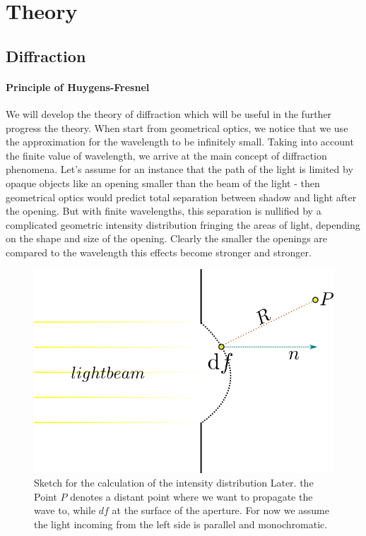 \section{Theory}
\subsection{Diffraction}
\paragraph{Principle of Huygens-Fresnel}
We will develop the theory of diffraction \cite{landau2} which will be useful in the further progress
the theory. When start from geometrical optics, we notice that we use the approximation for the 
wavelength to be infinitely small. Taking into account the finite value of wavelength, we arrive at the
main concept of diffraction phenomena. Let's assume for an instance that the path of the light is limited by
opaque objects like an opening smaller than the beam of the light - then geometrical optics would predict 
total separation between shadow and light after the opening. But with finite wavelengths, this separation
is nullified by a complicated geometric intensity distribution fringing the areas of light,
depending on the shape and size of the opening. Clearly the smaller the openings are compared to the
wavelength this effects become stronger and stronger.
\begin{figure}[htpb]
    \centering
    \includegraphics[width=0.5\linewidth]{figures/beam}
    \caption{Sketch for the calculation of the intensity distribution Later. the Point $P$ denotes a distant
        point where we want to propagate the wave to, while $df$ at the surface of the aperture. For now 
        we assume the light incoming from the left side is parallel and monochromatic.}
    \label{fig:beam}
\end{figure}
